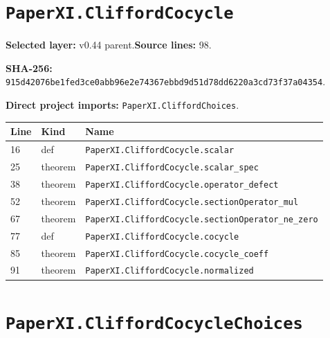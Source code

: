 \documentclass[10pt,oneside]{book}
\begin{document}
\section{\texorpdfstring{\nolinkurl{PaperXI.CliffordCocycle}}{PaperXI.CliffordCocycle}}\label{module:PaperXI.CliffordCocycle}

\textbf{Selected layer:} v0.44 parent.\quad\textbf{Source lines:} 98.\par\textbf{SHA-256:} {\scriptsize\nolinkurl{915d42076be1fed3ce0abb96e2e74367ebbd9d51d78dd6220a3cd73f37a04354}}.


\textbf{Direct project imports:} \nolinkurl{PaperXI.CliffordChoices}.

\begin{longtable}{@{}p{}p{}p{}@{}}\toprule Line&Kind&Name\\\midrule\endhead

16&def&\nolinkurl{PaperXI.CliffordCocycle.scalar}\\

25&theorem&\nolinkurl{PaperXI.CliffordCocycle.scalar_spec}\\

38&theorem&\nolinkurl{PaperXI.CliffordCocycle.operator_defect}\\

52&theorem&\nolinkurl{PaperXI.CliffordCocycle.sectionOperator_mul}\\

67&theorem&\nolinkurl{PaperXI.CliffordCocycle.sectionOperator_ne_zero}\\

77&def&\nolinkurl{PaperXI.CliffordCocycle.cocycle}\\

85&theorem&\nolinkurl{PaperXI.CliffordCocycle.cocycle_coeff}\\

91&theorem&\nolinkurl{PaperXI.CliffordCocycle.normalized}\\

\bottomrule\end{longtable}

\section{\texorpdfstring{\nolinkurl{PaperXI.CliffordCocycleChoices}}{PaperXI.CliffordCocycleChoices}}\label{module:PaperXI.CliffordCocycleChoices}
\end{document}
